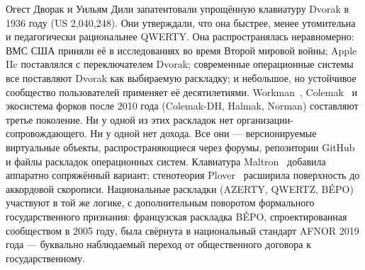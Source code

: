 \documentclass[10pt,letterpaper,twocolumn]{article}
\begin{document}
Огест Дворак и Уильям Дили запатентовали упрощённую клавиатуру Dvorak в 1936 году (US 2{,}040{,}248). Они утверждали, что она быстрее, менее утомительна и педагогически рациональнее QWERTY. Она распространялась неравномерно: ВМС США приняли её в исследованиях во время Второй мировой войны; Apple IIc поставлялся с переключателем Dvorak; современные операционные системы все поставляют Dvorak как выбираемую раскладку; и небольшое, но устойчивое сообщество пользователей применяет её десятилетиями. Workman~\citep{bucao2010workman}, Colemak~\citep{coleman2006colemak} и экосистема форков после 2010 года (Colemak-DH, Halmak, Norman) составляют третье поколение. Ни у одной из этих раскладок нет организации-сопровождающего. Ни у одной нет дохода. Все они --- версионируемые виртуальные объекты, распространяющиеся через форумы, репозитории GitHub и файлы раскладок операционных систем. Клавиатура Maltron~\citep{malt1977keyboard} добавила аппаратно сопряжённый вариант; стенотеория Plover~\citep{knight2010plover} расширила поверхность до аккордовой скорописи. Национальные раскладки (AZERTY, QWERTZ, BÉPO) участвуют в той же логике, с дополнительным поворотом формального государственного признания: французская раскладка BÉPO, спроектированная сообществом в 2005 году, была свёрнута в национальный стандарт AFNOR 2019 года --- буквально наблюдаемый переход от общественного договора к государственному.
\end{document}

